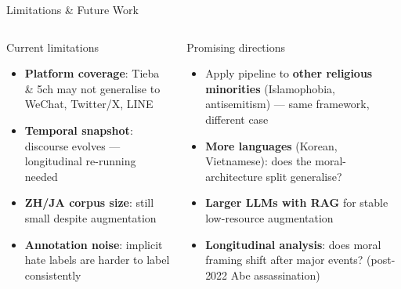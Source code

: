 \documentclass[aspectratio=169,10pt]{beamer}
\begin{document}
\begin{frame}{Limitations \& Future Work}
  \begin{columns}[T]
      \begin{alertblock}{Current limitations}
        \begin{itemize}\small
          \item \textbf{Platform coverage}: Tieba \& 5ch may not generalise to WeChat, Twitter/X, LINE
          \item \textbf{Temporal snapshot}: discourse evolves --- longitudinal re-running needed
          \item \textbf{ZH/JA corpus size}: still small despite augmentation
          \item \textbf{Annotation noise}: implicit hate labels are harder to label consistently
        \end{itemize}
      \end{alertblock}
      \begin{block}{Promising directions}
        \begin{itemize}\small
          \item Apply pipeline to \textbf{other religious minorities} (Islamophobia, antisemitism) --- same framework, different case
          \item \textbf{More languages} (Korean, Vietnamese): does the moral-architecture split generalise?
          \item \textbf{Larger LLMs with RAG} for stable low-resource augmentation
          \item \textbf{Longitudinal analysis}: does moral framing shift after major events? (post-2022 Abe assassination)
        \end{itemize}
      \end{block}
  \end{columns}
\end{frame}
\end{document}
